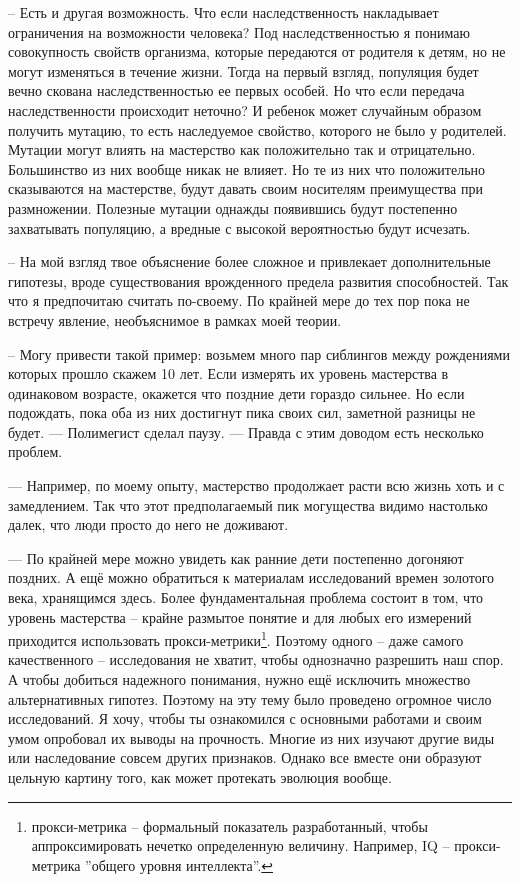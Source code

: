 \documentclass[12pt,a4paper]{article}
\begin{document}
-- Есть и другая возможность. Что если наследственность накладывает ограничения на возможности человека? Под наследственностью я понимаю совокупность свойств организма, которые передаются от родителя к детям, но не могут изменяться в течение жизни. Тогда на первый взгляд, популяция будет вечно скована наследственностью ее первых особей. Но что если передача наследственности происходит неточно? И ребенок может случайным образом получить мутацию, то есть наследуемое свойство, которого не было у родителей. Мутации могут влиять на мастерство как положительно так и отрицательно. Большинство из них вообще никак не влияет. Но те из них что положительно сказываются на мастерстве, будут давать своим носителям преимущества при размножении. Полезные мутации однажды появившись будут постепенно захватывать популяцию, а вредные с высокой вероятностью будут исчезать.

-- На мой взгляд твое объяснение более сложное и привлекает дополнительные гипотезы, вроде существования врожденного предела развития способностей. Так что я предпочитаю считать по-своему. По крайней мере до тех пор пока не встречу явление, необъяснимое в рамках моей теории.

-- Могу привести такой пример: возьмем много пар сиблингов между рождениями которых прошло скажем 10 лет. Если измерять их уровень мастерства в одинаковом возрасте, окажется что поздние дети гораздо сильнее. Но если подождать, пока оба из них достигнут пика своих сил, заметной разницы не будет. --- Полимегист сделал паузу. --- Правда с этим доводом есть несколько проблем.

--- Например, по моему опыту, мастерство продолжает расти всю жизнь хоть и с замедлением. Так что этот предполагаемый пик могущества видимо настолько далек, что люди просто до него не доживают.

--- По крайней мере можно увидеть как ранние дети постепенно догоняют поздних. А ещё можно обратиться к материалам исследований времен золотого века, хранящимся здесь. Более фундаментальная проблема состоит в том, что уровень мастерства -- крайне размытое понятие и для любых его измерений приходится использовать прокси-метрики\footnote{прокси-метрика -- формальный показатель разработанный, чтобы аппроксимировать нечетко определенную величину. Например, IQ -- прокси-метрика ''общего уровня интеллекта''.}. Поэтому одного -- даже самого качественного -- исследования не хватит, чтобы однозначно разрешить наш спор. А чтобы добиться надежного понимания, нужно ещё исключить множество альтернативных гипотез. Поэтому на эту тему было проведено огромное число исследований. Я хочу, чтобы ты ознакомился с основными работами и своим умом опробовал их выводы на прочность. Многие из них изучают другие виды или наследование совсем других признаков. Однако все вместе они образуют цельную картину того, как может протекать эволюция вообще.
\end{document}
